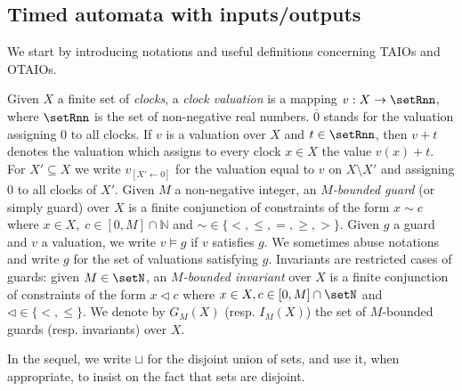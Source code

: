 \documentclass{LMCS}
\theoremstyle{plain}\newtheorem{proposition}[thm]{Proposition}
\begin{document}
\subsection{Timed automata with inputs/outputs}

We start by introducing notations and useful definitions concerning
TAIOs and OTAIOs.

Given $X$ a finite set of {\it clocks}, 
a {\it clock valuation} is a
mapping $v:X \rightarrow \setRnn$, where $\setRnn$ 
is the set of non-negative real numbers.  
$\bar{0}$ stands for the valuation assigning $0$ to all clocks.
If $v$ is a valuation over
$X$ and $t\in \setRnn$, then $v+t$ denotes the valuation which assigns
to every clock $x\in X$ the value $v(x)+t$.
For $X' \subseteq X$ we write $v_{[X'\leftarrow0]}$ for the valuation
equal to $v$ on $X \setminus X'$ and 
assigning $0$ to all clocks of $X'$.
Given $M$ a non-negative integer, an {\it $M$-bounded guard} (or
simply guard) over $X$ is a finite conjunction of constraints of the
form $x \sim c$ where $x\in X,\; c\in [0,M]\cap\mathbb{N}$ and $\sim
\in \{<,\le,=,\ge,>\}$. 
Given $g$ a guard and $v$ a valuation, we write $v
\models g$ if $v$ satisfies $g$.  We sometimes abuse notations and write $g$ for
the set of valuations satisfying $g$.  Invariants are restricted
cases of guards: given $M \in \setN$, an {\em $M$-bounded invariant} over
$X$ is a finite conjunction of constraints of the form $x \lhd c$
where $x \in X, c \in [0,M] \cap \setN$ and $\lhd \in \{<,\leq\}$.  
We denote by $G_M(X)$ (resp.  $I_M(X)$)
the set of $M$-bounded guards (resp. invariants) over $X$.




In the sequel, we write $\sqcup$ for the disjoint union of sets,
  and use it, when appropriate, to insist on the fact that sets are
  disjoint.
\end{document}
